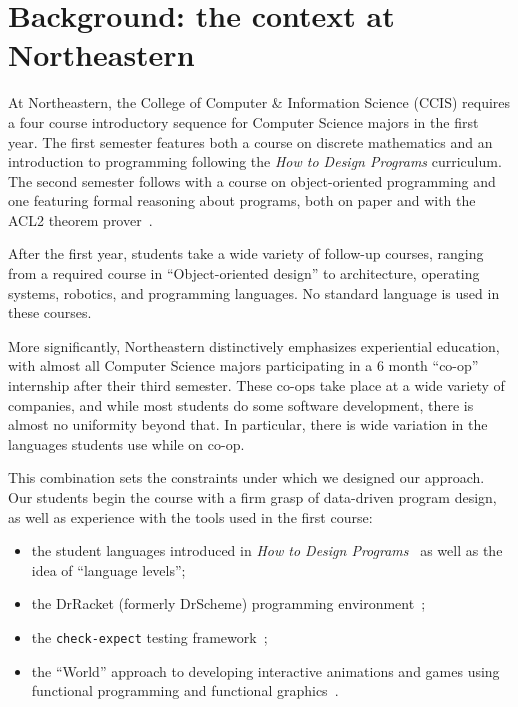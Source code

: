 \documentclass[submission,copyright]{eptcs}
\begin{document}
\section{Background: the context at Northeastern}
\label{sec:background}

At Northeastern, the College of Computer \& Information Science (CCIS)
requires a four course introductory sequence for Computer Science majors in the first year.  The
first semester features both a course on discrete mathematics and
 an introduction to programming following the \emph{How to Design
  Programs} curriculum.  The second semester follows with a course on
object-oriented programming and one featuring formal reasoning about
programs, both on paper and with the ACL2 theorem
prover~\cite{dvanhorn:Kaufmann2000ComputerAided}.

After the first year, students take a wide variety of
follow-up courses, ranging from a required course in ``Object-oriented
design'' to architecture, operating systems, robotics, and programming
languages.  No standard language is used in these courses.  

More significantly, Northeastern distinctively emphasizes experiential
education, with almost all Computer Science majors participating in a
6 month ``co-op'' internship after their third semester.  These co-ops
take place at a wide variety of companies, and while most students do
some software development, there is almost no uniformity beyond that.
In particular, there is wide variation in the languages students use
while on co-op.

This combination sets the constraints under which we designed our
approach.  Our students begin the course with a firm grasp of
data-driven program design, as well as experience with the tools used
in the first course:

\begin{itemize}
  \item the student languages introduced in \emph{How to Design
    Programs}~\cite{dvanhorn:Felleisen2004Structure,
    dvanhorn:Felleisen2001How} as well as the idea of ``language levels'';

  \item the DrRacket (formerly DrScheme) 
    programming environment~\cite{dvanhorn:Findler2002DrScheme};

  \item the \texttt{check-expect} testing framework~\cite{local:check-expect};

  \item the ``World'' approach to developing interactive animations
    and games using functional programming and functional
    graphics~\cite{dvanhorn:Felleisen2009Functional,
      local:barland-sfp10}.
\end{itemize}
\end{document}

